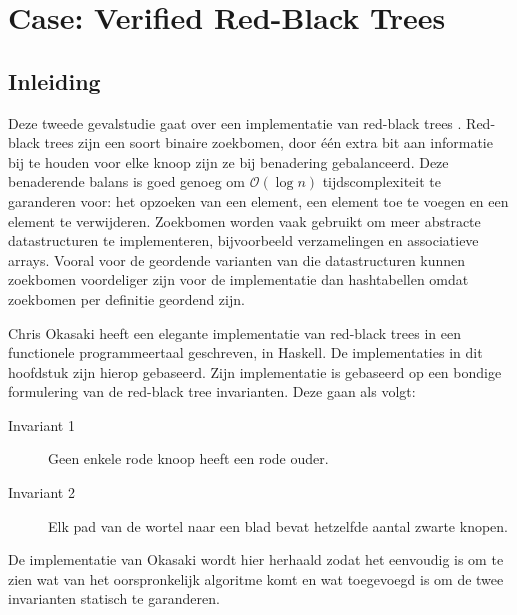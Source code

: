 \chapter{Case: Verified Red-Black Trees}
\label{case:rbtree}


\section{Inleiding}

Deze tweede gevalstudie gaat over een implementatie van red-black trees
\cite{rbtrees}. Red-black trees zijn een soort binaire zoekbomen, door één
extra bit aan informatie bij te houden voor elke knoop zijn ze bij benadering
gebalanceerd. Deze benaderende balans is goed genoeg om $\mathcal{O}(\log{}n)$
tijdscomplexiteit te garanderen voor: het opzoeken van een element, een element
toe te voegen en een element te verwijderen. Zoekbomen worden vaak gebruikt om
meer abstracte datastructuren te implementeren, bijvoorbeeld verzamelingen en
associatieve arrays. Vooral voor de geordende varianten van die datastructuren
kunnen zoekbomen voordeliger zijn voor de implementatie dan hashtabellen omdat
zoekbomen per definitie geordend zijn.

Chris Okasaki heeft een elegante implementatie van red-black trees
\cite{okasaki} in een functionele programmeertaal geschreven, in Haskell.
De implementaties in dit hoofdstuk zijn hierop gebaseerd.
Zijn implementatie is gebaseerd op een bondige formulering van de red-black
tree invarianten. Deze gaan als volgt:

\begin{description}
  \item[Invariant 1] Geen enkele rode knoop heeft een rode ouder.
  \item[Invariant 2] Elk pad van de wortel naar een blad bevat hetzelfde aantal
                     zwarte knopen.
\end{description}

De implementatie van Okasaki wordt hier herhaald zodat het eenvoudig is om te
zien wat van het oorspronkelijk algoritme komt en wat toegevoegd is om de twee
invarianten statisch te garanderen.


